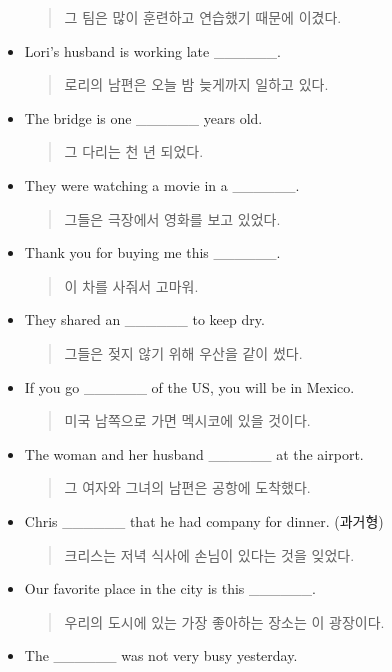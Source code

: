 \documentclass{article}
\begin{document}
\begin{addmargin}[1em]{1em}
\begin{itemize}
    \begin{quote}
    그 팀은 많이 훈련하고 연습했기 때문에 이겼다.
    \end{quote}
    \item Lori's husband is working late \_\_\_\_\_\_.
    \begin{quote}
    로리의 남편은 오늘 밤 늦게까지 일하고 있다.
    \end{quote}
    \item The bridge is one \_\_\_\_\_\_ years old.
    \begin{quote}
    그 다리는 천 년 되었다.
    \end{quote}
    \item They were watching a movie in a \_\_\_\_\_\_.
    \begin{quote}
    그들은 극장에서 영화를 보고 있었다.
    \end{quote}
    \item Thank you for buying me this \_\_\_\_\_\_.
    \begin{quote}
    이 차를 사줘서 고마워.
    \end{quote}
    \newpage
    \item They shared an \_\_\_\_\_\_ to keep dry.
    \begin{quote}
    그들은 젖지 않기 위해 우산을 같이 썼다.
    \end{quote}
    \item If you go \_\_\_\_\_\_ of the US, you will be in Mexico.
    \begin{quote}
    미국 남쪽으로 가면 멕시코에 있을 것이다.
    \end{quote}
    \item The woman and her husband \_\_\_\_\_\_ at the airport.
    \begin{quote}
    그 여자와 그녀의 남편은 공항에 도착했다.
    \end{quote}
    \item Chris \_\_\_\_\_\_ that he had company for dinner. (과거형)
    \begin{quote}
    크리스는 저녁 식사에 손님이 있다는 것을 잊었다.
    \end{quote}
    \item Our favorite place in the city is this \_\_\_\_\_\_.
    \begin{quote}
    우리의 도시에 있는 가장 좋아하는 장소는 이 광장이다.
    \end{quote}
    \item The \_\_\_\_\_\_ was not very busy yesterday.
    \begin{quote}

\end{quote}
\end{itemize}
\end{addmargin}
\end{document}
